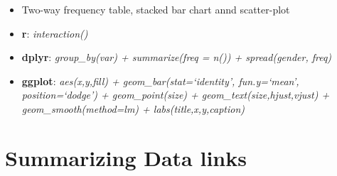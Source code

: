 \documentclass[
]{book}
\providecommand{\tightlist}{%
  \setlength{\itemsep}{0pt}\setlength{\parskip}{0pt}}
\begin{document}
\begin{enumerate}
  \begin{itemize}
  \tightlist
  \item
    Two-way frequency table, stacked bar chart annd scatter-plot
  \item
    \textbf{r}: \emph{interaction()}
  \item
    \textbf{dplyr}: \emph{group\_by(var) + summarize(freq = n()) + spread(gender, freq)}
  \item
    \textbf{ggplot}: \emph{aes(x,y,fill) + geom\_bar(stat=`identity', fun.y=`mean', position=`dodge') + geom\_point(size) + geom\_text(size,hjust,vjust) + geom\_smooth(method=lm) + labs(title,x,y,caption)}
  \end{itemize}
\end{enumerate}

\hypertarget{summarizing-data-links}{%
\section{Summarizing Data links}\label{summarizing-data-links}}
\end{document}
